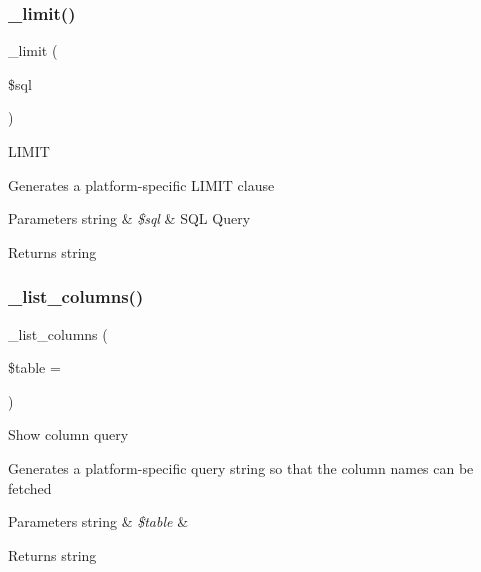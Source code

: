 \subsubsection{\texorpdfstring{\+\_\+limit()}{\_limit()}}
{\footnotesize\ttfamily \+\_\+limit (\begin{DoxyParamCaption}\item[{}]{\$sql }\end{DoxyParamCaption})\hspace{0.3cm}{\ttfamily [protected]}}

L\+I\+M\+IT

Generates a platform-\/specific L\+I\+M\+IT clause


\begin{DoxyParams}[1]{Parameters}
string & {\em \$sql} & S\+QL Query \\
\hline
\end{DoxyParams}
\begin{DoxyReturn}{Returns}
string 
\end{DoxyReturn}
\mbox{\label{class_c_i___d_b__oci8__driver_a7ccb7f9c301fe7f0a9db701254142b63}} 
\subsubsection{\texorpdfstring{\+\_\+list\+\_\+columns()}{\_list\_columns()}}
{\footnotesize\ttfamily \+\_\+list\+\_\+columns (\begin{DoxyParamCaption}\item[{}]{\$table = {\ttfamily \textquotesingle{}\textquotesingle{}} }\end{DoxyParamCaption})\hspace{0.3cm}{\ttfamily [protected]}}

Show column query

Generates a platform-\/specific query string so that the column names can be fetched


\begin{DoxyParams}[1]{Parameters}
string & {\em \$table} & \\
\hline
\end{DoxyParams}
\begin{DoxyReturn}{Returns}
string 
\end{DoxyReturn}
\mbox{\label{class_c_i___d_b__oci8__driver_a435c0f3ce54fe7daa178baa8532ebd54}} 
